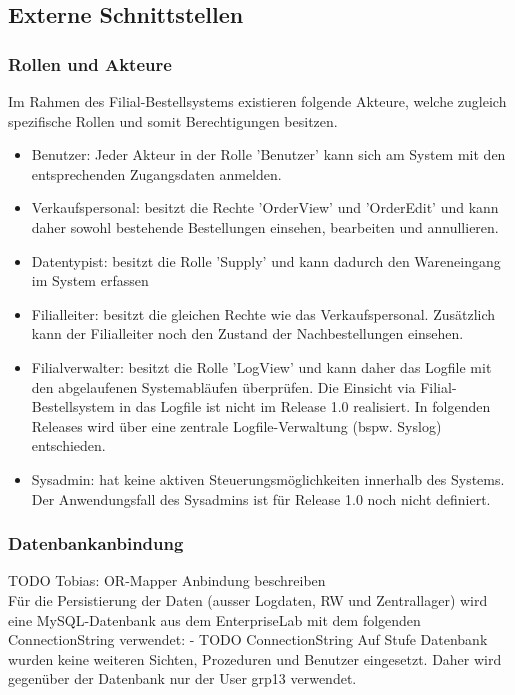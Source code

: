 \subsection{Externe Schnittstellen}
\subsubsection{Rollen und Akteure}
Im Rahmen des Filial-Bestellsystems existieren folgende Akteure, welche zugleich spezifische Rollen und somit Berechtigungen besitzen.
\begin{itemize}
	\item Benutzer: Jeder Akteur in der Rolle 'Benutzer' kann sich am System mit den entsprechenden Zugangsdaten anmelden.
	\item Verkaufspersonal: besitzt die Rechte 'OrderView' und 'OrderEdit' und kann daher sowohl bestehende Bestellungen einsehen, bearbeiten und annullieren. 
	\item Datentypist: besitzt die Rolle 'Supply' und kann dadurch den Wareneingang im System erfassen
	\item Filialleiter: besitzt die gleichen Rechte wie das Verkaufspersonal. Zusätzlich kann der Filialleiter noch den Zustand der Nachbestellungen einsehen.
	\item Filialverwalter: besitzt die Rolle 'LogView' und kann daher das Logfile mit den abgelaufenen Systemabläufen überprüfen. Die Einsicht via Filial-Bestellsystem in das Logfile ist nicht im Release 1.0 realisiert. In folgenden Releases wird über eine zentrale Logfile-Verwaltung (bspw. Syslog) entschieden. 
	\item Sysadmin: hat keine aktiven Steuerungsmöglichkeiten innerhalb des Systems. Der Anwendungsfall des Sysadmins ist für Release 1.0 noch nicht definiert.
\end{itemize}
\subsubsection{Datenbankanbindung}
TODO Tobias: OR-Mapper Anbindung beschreiben\\

Für die Persistierung der Daten (ausser Logdaten, RW und Zentrallager) wird eine MySQL-Datenbank aus dem EnterpriseLab mit dem folgenden ConnectionString verwendet:
- TODO ConnectionString
Auf Stufe Datenbank wurden keine weiteren Sichten, Prozeduren und Benutzer eingesetzt. Daher wird gegenüber der Datenbank nur der User grp13 verwendet.
